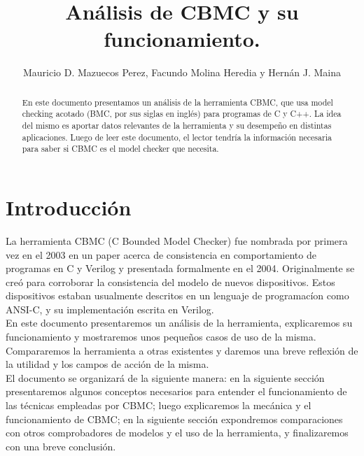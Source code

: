\documentclass{llncs}
\title{Análisis de CBMC y su funcionamiento.}
\author{Mauricio D. Mazuecos Perez, Facundo Molina Heredia y Hernán J. Maina}
\institute{Facultad de Matemática, Astronomía, Física y Computación\\
Universidad Nacional de Córdoba}
\begin{document}
\maketitle

\begin{abstract}
    En este documento presentamos un análisis de la herramienta CBMC, que usa
    model checking acotado (BMC, por sus siglas en inglés) para
    programas de C y C++. La idea del mismo es aportar datos
    relevantes de la herramienta y su desempeño en distintas aplicaciones. Luego
    de leer este documento, el lector tendría la información necesaria para
    saber si CBMC es el model checker que necesita.

\end{abstract}


\section{Introducción}
    La herramienta CBMC (C Bounded Model Checker) fue nombrada por primera vez
    en el 2003 en un paper acerca de consistencia en comportamiento de programas
    en C y Verilog\cite{firstcbmc} y presentada formalmente en el
    2004\cite{cbmcpaper}. Originalmente se creó para corroborar la consistencia
    del modelo de nuevos dispositivos. Estos dispositivos estaban usualmente
    descritos en un lenguaje de programacíon como ANSI-C, y su implementación
    escrita en Verilog.\\
    \indent En este documento presentaremos un análisis de la herramienta,
    explicaremos su funcionamiento y mostraremos unos pequeños casos de uso de
    la misma. Compararemos la herramienta a otras existentes y daremos una breve
    reflexión de la utilidad y los campos de acción de la misma.\\
    \indent El documento se organizará de la siguiente manera: en la siguiente
    sección presentaremos algunos conceptos necesarios para entender el
    funcionamiento de las técnicas empleadas por CBMC; luego explicaremos la
    mecánica y el funcionamiento de CBMC; en la siguiente sección expondremos
    comparaciones con otros comprobadores de modelos y el uso de la
    herramienta, y finalizaremos con una breve conclusión.

\end{document}
